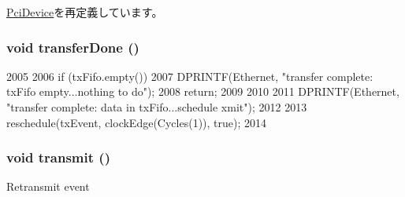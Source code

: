 \hyperlink{classPciDevice_a53e036786d17361be4c7320d39c99b84}{PciDevice}を再定義しています。\hypertarget{classNSGigE_ac47b2c25cccfafe7e2c12673a1b3e793}{
\subsubsection[{transferDone}]{\setlength{\rightskip}{0pt plus 5cm}void transferDone ()}}
\label{classNSGigE_ac47b2c25cccfafe7e2c12673a1b3e793}



\begin{DoxyCode}
2005 {
2006     if (txFifo.empty()) {
2007         DPRINTF(Ethernet, "transfer complete: txFifo empty...nothing to do\n");
2008         return;
2009     }
2010 
2011     DPRINTF(Ethernet, "transfer complete: data in txFifo...schedule xmit\n");
2012 
2013     reschedule(txEvent, clockEdge(Cycles(1)), true);
2014 }
\end{DoxyCode}
\hypertarget{classNSGigE_af04463ca216d10ffa94db8463cee04c9}{
\subsubsection[{transmit}]{\setlength{\rightskip}{0pt plus 5cm}void transmit ()}}
\label{classNSGigE_af04463ca216d10ffa94db8463cee04c9}
Retransmit event 



